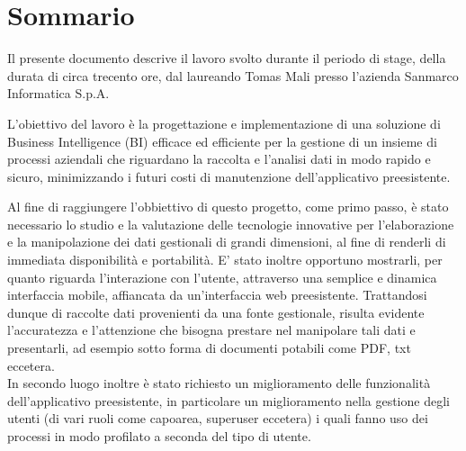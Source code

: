 
\cleardoublepage
{}
{}
\begingroup
\let\clearpage\relax
\let\cleardoublepage\relax
\let\cleardoublepage\relax

\chapter*{Sommario}

Il presente documento descrive il lavoro svolto durante il periodo di stage, della durata di circa trecento ore, dal laureando Tomas Mali presso l'azienda Sanmarco Informatica S.p.A.

L'obiettivo del lavoro è la progettazione e implementazione di una soluzione di Business Intelligence (BI) efficace ed efficiente  per la gestione di un insieme di processi aziendali  che riguardano la raccolta e l'analisi dati in modo rapido e sicuro, minimizzando i futuri costi di manutenzione dell'applicativo preesistente.\

Al fine di raggiungere l'obbiettivo di questo progetto, come primo passo, è stato necessario lo studio e la valutazione delle tecnologie innovative  per l'elaborazione e la manipolazione dei dati gestionali di grandi dimensioni, al fine di renderli di immediata disponibilità e portabilità. E' stato inoltre opportuno mostrarli, per quanto riguarda l'interazione con l'utente, attraverso una semplice e dinamica interfaccia mobile, affiancata da un'interfaccia web preesistente. Trattandosi dunque di raccolte dati provenienti da una fonte gestionale, risulta evidente l'accuratezza e l'attenzione  che bisogna prestare nel manipolare tali dati e presentarli, ad esempio sotto forma di documenti potabili come PDF, txt eccetera.\\ 
In secondo luogo inoltre è stato richiesto un miglioramento delle funzionalità dell'applicativo preesistente, in particolare un miglioramento nella gestione degli utenti (di vari ruoli come capoarea, superuser eccetera) i quali fanno uso dei processi  in modo profilato a seconda del tipo di utente.

%
%

\endgroup			

\vfill

